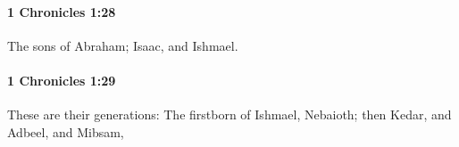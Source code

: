 		\paragraph{1 Chronicles 1:28} %
			\label{1CHRONICLES-1-28}

			The sons of Abraham; Isaac, and Ishmael.


		\paragraph{1 Chronicles 1:29} %
			\label{1CHRONICLES-1-29}

			These are their generations: The firstborn of Ishmael, Nebaioth; then Kedar, and Adbeel, and Mibsam,


